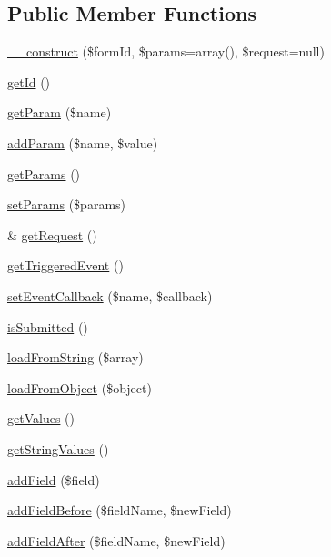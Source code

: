 \subsection*{Public Member Functions}
\begin{DoxyCompactItemize}
\item 
\hyperlink{classTk_1_1Form_ae9d2adc13998c0d8235e8ccd72502379}{\+\_\+\+\_\+construct} (\$form\+Id, \$params=array(), \$request=null)
\item 
\hyperlink{classTk_1_1Form_a9f326acf88301f2dfedc6207d46f3b3c}{get\+Id} ()
\item 
\hyperlink{classTk_1_1Form_a158a24883b432d44c8026c530e318476}{get\+Param} (\$name)
\item 
\hyperlink{classTk_1_1Form_ab7ef439d6244a7a1e26379dd8d40d9a1}{add\+Param} (\$name, \$value)
\item 
\hyperlink{classTk_1_1Form_a14ceaba4e12b17a98ba8fb072bfe3dfc}{get\+Params} ()
\item 
\hyperlink{classTk_1_1Form_a3f9504ad3a60ffdebed195f3d18b54ee}{set\+Params} (\$params)
\item 
\& \hyperlink{classTk_1_1Form_aa782ecaad585c31a4909d7d1f02993fc}{get\+Request} ()
\item 
\hyperlink{classTk_1_1Form_ab556964effdbc6855033c5015d7b677a}{get\+Triggered\+Event} ()
\item 
\hyperlink{classTk_1_1Form_ac8a33e8688d09999bce46c22c93a3f73}{set\+Event\+Callback} (\$name, \$callback)
\item 
\hyperlink{classTk_1_1Form_a2eb85384e0c0bdc88304961405a9236c}{is\+Submitted} ()
\item 
\hyperlink{classTk_1_1Form_ae9d0fd2f206bc8b059649819c9794a8c}{load\+From\+String} (\$array)
\item 
\hyperlink{classTk_1_1Form_a7b26b4e41292576b08e65d67ff38ec5a}{load\+From\+Object} (\$object)
\item 
\hyperlink{classTk_1_1Form_a9e9675f4e1207457b25c12bec098ccdb}{get\+Values} ()
\item 
\hyperlink{classTk_1_1Form_a7394db68dd5042a6bf1ce61a419fbf8e}{get\+String\+Values} ()
\item 
\hyperlink{classTk_1_1Form_a76c65ab7506669afee654274961b995d}{add\+Field} (\$field)
\item 
\hyperlink{classTk_1_1Form_a3aee4b0da6dd94939d727dec95f751db}{add\+Field\+Before} (\$field\+Name, \$new\+Field)
\item 
\hyperlink{classTk_1_1Form_a5c8613f3a4ce5db902f4c7c0c122c4e1}{add\+Field\+After} (\$field\+Name, \$new\+Field)

\end{DoxyCompactItemize}
